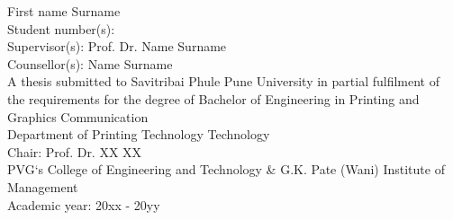 \noindent\fontsize{15}{0}\selectfont First name Surname
\vspace{2mm}\\
\fontsize{13}{0}\selectfont Student number(s):  \vspace{1cm}\\
\noindent\fontsize{14}{0}\selectfont Supervisor(s): Prof. Dr.  Name Surname\\ %
\fontsize{14}{0}\selectfont Counsellor(s): Name Surname \vspace{1cm}\\ %
\noindent\fontsize{13}{0}\selectfont A thesis submitted to Savitribai Phule Pune University in partial fulfilment of the requirements for the degree of Bachelor of Engineering in Printing and Graphics Communication \vspace{1cm}\\
\noindent \fontsize{13}{0}\selectfont Department of Printing Technology Technology\\
Chair: Prof. Dr. XX XX \vspace{5mm}\\
\noindent PVG`s College of Engineering and Technology \& G.K. Pate (Wani) Institute of Management \vspace{2mm}\\
Academic year: 20xx - 20yy 
\vspace*{\fill}

